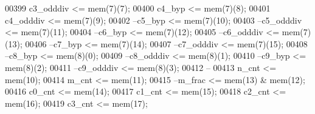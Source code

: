 \begin{DoxyCode}
00399 \textcolor{vhdlchar}{c3_odddiv}      \textcolor{vhdlchar}{<=} \textcolor{vhdlchar}{mem}\textcolor{vhdlchar}{(}\textcolor{vhdllogic}{}\textcolor{vhdllogic}{7}\textcolor{vhdlchar}{)}\textcolor{vhdlchar}{(}\textcolor{vhdllogic}{}\textcolor{vhdllogic}{7}\textcolor{vhdlchar}{)};
00400 \textcolor{vhdlchar}{c4_byp}         \textcolor{vhdlchar}{<=} \textcolor{vhdlchar}{mem}\textcolor{vhdlchar}{(}\textcolor{vhdllogic}{}\textcolor{vhdllogic}{7}\textcolor{vhdlchar}{)}\textcolor{vhdlchar}{(}\textcolor{vhdllogic}{}\textcolor{vhdllogic}{8}\textcolor{vhdlchar}{)};
00401 \textcolor{vhdlchar}{c4_odddiv}      \textcolor{vhdlchar}{<=} \textcolor{vhdlchar}{mem}\textcolor{vhdlchar}{(}\textcolor{vhdllogic}{}\textcolor{vhdllogic}{7}\textcolor{vhdlchar}{)}\textcolor{vhdlchar}{(}\textcolor{vhdllogic}{}\textcolor{vhdllogic}{9}\textcolor{vhdlchar}{)};
00402 \textcolor{keyword}{--c5\_byp       <= mem(7)(10);}
00403 \textcolor{keyword}{--c5\_odddiv    <= mem(7)(11);}
00404 \textcolor{keyword}{--c6\_byp       <= mem(7)(12);}
00405 \textcolor{keyword}{--c6\_odddiv    <= mem(7)(13);}
00406 \textcolor{keyword}{--c7\_byp       <= mem(7)(14);}
00407 \textcolor{keyword}{--c7\_odddiv    <= mem(7)(15);}
00408 \textcolor{keyword}{--c8\_byp       <= mem(8)(0);}
00409 \textcolor{keyword}{--c8\_odddiv    <= mem(8)(1);}
00410 \textcolor{keyword}{--c9\_byp       <= mem(8)(2);}
00411 \textcolor{keyword}{--c9\_odddiv    <= mem(8)(3);}
00412 \textcolor{keyword}{--}
00413 \textcolor{vhdlchar}{n_cnt}          \textcolor{vhdlchar}{<=} \textcolor{vhdlchar}{mem}\textcolor{vhdlchar}{(}\textcolor{vhdllogic}{}\textcolor{vhdllogic}{10}\textcolor{vhdlchar}{)};
00414 \textcolor{vhdlchar}{m_cnt}          \textcolor{vhdlchar}{<=} \textcolor{vhdlchar}{mem}\textcolor{vhdlchar}{(}\textcolor{vhdllogic}{}\textcolor{vhdllogic}{11}\textcolor{vhdlchar}{)};
00415 \textcolor{keyword}{--m\_frac       <= mem(13) & mem(12);}
00416 \textcolor{vhdlchar}{c0_cnt}         \textcolor{vhdlchar}{<=} \textcolor{vhdlchar}{mem}\textcolor{vhdlchar}{(}\textcolor{vhdllogic}{}\textcolor{vhdllogic}{14}\textcolor{vhdlchar}{)}; 
00417 \textcolor{vhdlchar}{c1_cnt}         \textcolor{vhdlchar}{<=} \textcolor{vhdlchar}{mem}\textcolor{vhdlchar}{(}\textcolor{vhdllogic}{}\textcolor{vhdllogic}{15}\textcolor{vhdlchar}{)}; 
00418 \textcolor{vhdlchar}{c2_cnt}         \textcolor{vhdlchar}{<=} \textcolor{vhdlchar}{mem}\textcolor{vhdlchar}{(}\textcolor{vhdllogic}{}\textcolor{vhdllogic}{16}\textcolor{vhdlchar}{)};
00419 \textcolor{vhdlchar}{c3_cnt}         \textcolor{vhdlchar}{<=} \textcolor{vhdlchar}{mem}\textcolor{vhdlchar}{(}\textcolor{vhdllogic}{}\textcolor{vhdllogic}{17}\textcolor{vhdlchar}{)};

\end{DoxyCode}
